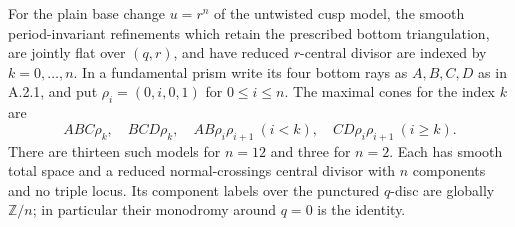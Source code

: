 \begin{proposition}[B.2.1; Proved]\label{push:B21}
For the plain base change $u=r^n$ of the untwisted cusp
model, the smooth period-invariant refinements which
retain the prescribed bottom triangulation, are jointly
flat over $(q,r)$, and have reduced $r$-central divisor
are indexed by $k=0,\ldots,n$. In a fundamental prism
write its four bottom rays as $A,B,C,D$ as in A.2.1,
and put $\rho_i=(0,i,0,1)$ for $0\leq i\leq n$.
The maximal cones for the index $k$ are
\[
 ABC\rho_k,\quad BCD\rho_k,\quad
 AB\rho_i\rho_{i+1}\ (i<k),\quad
 CD\rho_i\rho_{i+1}\ (i\geq k).
\]
There are thirteen such models for $n=12$ and three
for $n=2$. Each has smooth total space and a reduced
normal-crossings central divisor with $n$ components
and no triple locus. Its component labels over the
punctured $q$-disc are globally $\mathbb Z/n$; in
particular their monodromy around $q=0$ is the identity.
\end{proposition}
